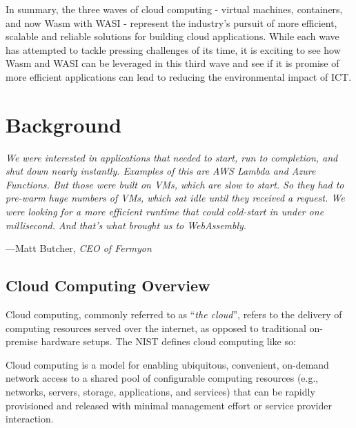 \documentclass[
  table]{report}
\begin{document}
In summary, the three waves of cloud computing - virtual machines,
containers, and now \ac{Wasm} with \ac{WASI} - represent the industry's
pursuit of more efficient, scalable and reliable solutions for building
cloud applications. While each wave has attempted to tackle pressing
challenges of its time, it is exciting to see how \ac{Wasm} and
\ac{WASI} can be leveraged in this third wave and see if it is promise
of more efficient applications can lead to reducing the environmental
impact of ICT.

\newpage

\chapter{Background}
\label{chap:background}

\setlength{}

\epigraph{\itshape  
We were interested in
applications that needed to start, run to completion, and shut down nearly
instantly. Examples of this are AWS Lambda and Azure Functions. But those were
built on VMs, which are slow to start. So they had to pre-warm huge numbers of
VMs, which sat idle until they received a request. We were looking for a more
efficient runtime that could cold-start in under one millisecond. And that’s
what brought us to WebAssembly.
}{---Matt Butcher, \textit{CEO of Fermyon}}

\section{Cloud Computing Overview}
\label{sect:cloud-overview}

Cloud computing, commonly referred to as ``\emph{the cloud}'', refers to
the delivery of computing resources served over the internet, as opposed
to traditional on-premise hardware setups. The \ac{NIST} defines cloud
computing like so:

\begin{tcolorbox}[
  definitionstyle,
  title=NIST definition of Cloud Computing,
]
Cloud computing is a model for enabling ubiquitous, convenient, on-demand
network access to a shared pool of configurable computing resources (e.g.,
networks, servers, storage, applications, and services) that can be rapidly
provisioned and released with minimal management effort or service provider
interaction. \\

\hfill \citep{nist-def}

\end{tcolorbox}
\end{document}
